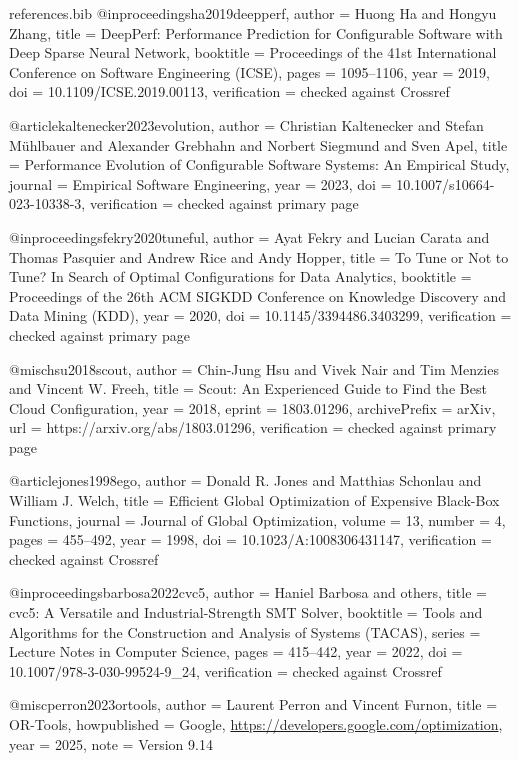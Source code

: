 \begin{filecontents*}[overwrite]{references.bib}
@inproceedings{ha2019deepperf,
  author = {Huong Ha and Hongyu Zhang},
  title = {{DeepPerf}: Performance Prediction for Configurable Software with Deep Sparse Neural Network},
  booktitle = {Proceedings of the 41st International Conference on Software Engineering (ICSE)},
  pages = {1095--1106},
  year = {2019},
  doi = {10.1109/ICSE.2019.00113},
  verification = {checked against Crossref}
}

@article{kaltenecker2023evolution,
  author = {Christian Kaltenecker and Stefan M{\"u}hlbauer and Alexander Grebhahn and Norbert Siegmund and Sven Apel},
  title = {Performance Evolution of Configurable Software Systems: An Empirical Study},
  journal = {Empirical Software Engineering},
  year = {2023},
  doi = {10.1007/s10664-023-10338-3},
  verification = {checked against primary page}
}

@inproceedings{fekry2020tuneful,
  author = {Ayat Fekry and Lucian Carata and Thomas Pasquier and Andrew Rice and Andy Hopper},
  title = {To Tune or Not to Tune? {I}n Search of Optimal Configurations for Data Analytics},
  booktitle = {Proceedings of the 26th ACM SIGKDD Conference on Knowledge Discovery and Data Mining (KDD)},
  year = {2020},
  doi = {10.1145/3394486.3403299},
  verification = {checked against primary page}
}

@misc{hsu2018scout,
  author = {Chin-Jung Hsu and Vivek Nair and Tim Menzies and Vincent W. Freeh},
  title = {Scout: An Experienced Guide to Find the Best Cloud Configuration},
  year = {2018},
  eprint = {1803.01296},
  archivePrefix = {arXiv},
  url = {https://arxiv.org/abs/1803.01296},
  verification = {checked against primary page}
}

@article{jones1998ego,
  author = {Donald R. Jones and Matthias Schonlau and William J. Welch},
  title = {Efficient Global Optimization of Expensive Black-Box Functions},
  journal = {Journal of Global Optimization},
  volume = {13},
  number = {4},
  pages = {455--492},
  year = {1998},
  doi = {10.1023/A:1008306431147},
  verification = {checked against Crossref}
}

@inproceedings{barbosa2022cvc5,
  author = {Haniel Barbosa and others},
  title = {cvc5: A Versatile and Industrial-Strength {SMT} Solver},
  booktitle = {Tools and Algorithms for the Construction and Analysis of Systems (TACAS)},
  series = {Lecture Notes in Computer Science},
  pages = {415--442},
  year = {2022},
  doi = {10.1007/978-3-030-99524-9_24},
  verification = {checked against Crossref}
}

@misc{perron2023ortools,
  author = {Laurent Perron and Vincent Furnon},
  title = {{OR-Tools}},
  howpublished = {Google, \url{https://developers.google.com/optimization}},
  year = {2025},
  note = {Version 9.14}
}


\end{filecontents*}
